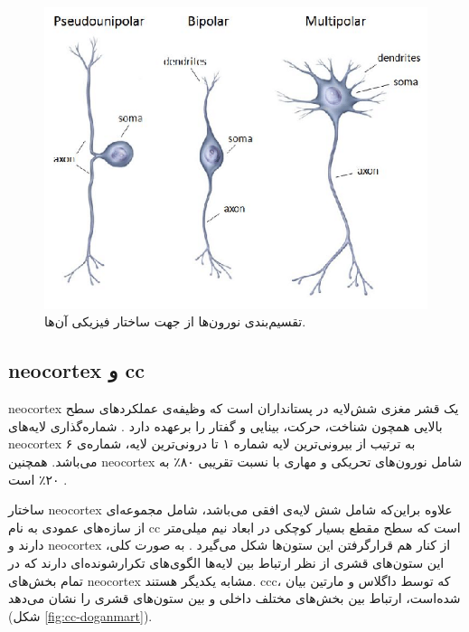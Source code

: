 \documentclass[12pt]{report}
\begin{document}
	\begin{figure}[]
		\centering
		\includegraphics[width=0.7\linewidth]{neurontypes.png}
		\caption[NS]{
			تقسیم‌بندی نورون‌ها از جهت ساختار فیزیکی آن‌ها.
		}
		\label{fig:neurontypes}
	\end{figure}
	
	\subsection{\gls{neocortex} و \gls{cc}}
	\gls{neocortex} یک قشر مغزی شش‌لایه در پستانداران است که وظیفه‌ی عملکرد‌های سطح بالایی همچون شناخت، حرکت، بینایی و گفتار را برعهده دارد
	\cite{Lui2011}. شماره‌گذاری لایه‌های \gls{neocortex} به ترتیب از بیرونی‌ترین لایه شماره ۱ تا درونی‌‌ترین لایه، شماره‌ی ۶ می‌باشد.
	همچنین \gls{neocortex} شامل نورون‌های تحریکی و مهاری با نسبت تقریبی ۸۰٪ به ۲۰٪ است
	\cite{noback2005human}.
	
	ساختار \gls{neocortex} علاوه براین‌که شامل شش لایه‌ی افقی می‌باشد، شامل مجموعه‌ای از سازه‌های عمودی به نام \gls{cc} است که سطح مقطع بسیار کوچکی در ابعاد نیم میلی‌متر دارند و \gls{neocortex} از کنار‌ هم قرار‌گرفتن این ستون‌ها شکل می‌گیرد
	\cite{Horton2005}.
	به صورت کلی، این ستون‌های قشری از نظر ارتباط بین لایه‌ها الگوی‌های تکرار‌شونده‌ای دارند که در تمام بخش‌های \gls{neocortex} مشابه یکدیگر هستند. \gls{ccc}، که توسط داگلاس و مارتین 
	\cite{Douglas2004}
	بیان شده‌است، ارتباط بین بخش‌های مختلف داخلی و بین ستون‌های قشری را نشان می‌دهد
	(شکل \ref{fig:cc-doganmart}).
	
\end{document}
